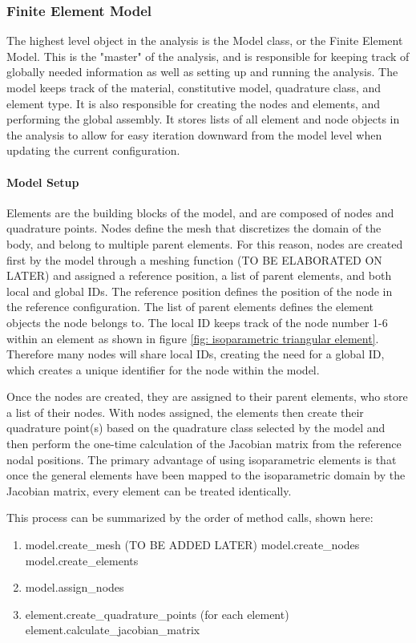 \documentclass[]{spie}  %
\begin{document}
\subsubsection{Finite Element Model}
The highest level object in the analysis is the Model class, or the Finite Element Model. This is the "master" of the analysis, and is responsible for keeping track of globally needed information as well as setting up and running the analysis. The model keeps track of the material, constitutive model, quadrature class, and element type. It is also responsible for creating the nodes and elements, and performing the global assembly. It stores lists of all element and node objects in the analysis to allow for easy iteration downward from the model level when updating the current configuration. 

\paragraph{Model Setup}
Elements are the building blocks of the model, and are composed of nodes and quadrature points. Nodes define the mesh that discretizes the domain of the body, and belong to multiple parent elements. For this reason, nodes are created first by the model through a meshing function (TO BE ELABORATED ON LATER) and assigned a reference position, a list of parent elements, and both local and global IDs. The reference position defines the position of the node in the reference configuration. The list of parent elements defines the element objects the node belongs to. The local ID keeps track of the node number 1-6 within an element as shown in figure \ref{fig: isoparametric triangular element}. Therefore many nodes will share local IDs, creating the need for a global ID, which creates a unique identifier for the node within the model.

Once the nodes are created, they are assigned to their parent elements, who store a list of their nodes. With nodes assigned, the elements then create their quadrature point(s) based on the quadrature class selected by the model and then perform the one-time calculation of the Jacobian matrix from the reference nodal positions. The primary advantage of using isoparametric elements is that once the general elements have been mapped to the isoparametric domain by the Jacobian matrix, every element can be treated identically.

This process can be summarized by the order of method calls, shown here:
\begin{enumerate}
	\item model.create\_mesh (TO BE ADDED LATER)
	\subitem model.create\_nodes
	\subitem model.create\_elements
	\item model.assign\_nodes
	\item element.create\_quadrature\_points (for each element)
	\subitem element.calculate\_jacobian\_matrix
\end{enumerate}
\end{document}
